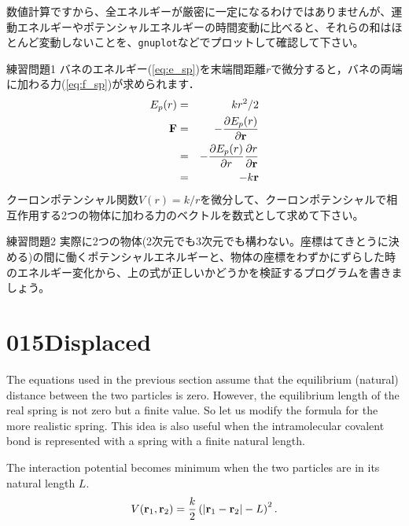 \documentclass[a4,10pt]{article}
\begin{document}
数値計算ですから、全エネルギーが厳密に一定になるわけではありませんが、運動エネルギーやポテンシャルエネルギーの時間変動に比べると、それらの和はほとんど変動しないことを、{\tt gnuplot}などでプロットして確認して下さい。

\begin{itembox}[l]{練習問題1}
バネのエネルギー(\ref{eq:e_sp})を末端間距離$r$で微分すると，バネの両端に加わる力(\ref{eq:f_sp})が求められます．
\begin{eqnarray}
E_p(r)&=&kr^2/2\\
{\bf F}&=&-\frac{\partial E_p(r)}{\partial {\bf r}}\\
&=&-\frac{\partial E_p(r)}{\partial r}\frac{\partial r}{\partial {\bf r}}\\
&=&-k{\bf r}
\end{eqnarray}
クーロンポテンシャル関数$V(r) = k / r$を微分して、クーロンポテンシャルで相互作用する2つの物体に加わる力のベクトルを数式として求めて下さい。
\end{itembox}

\begin{itembox}[l]{練習問題2}
実際に2つの物体(2次元でも3次元でも構わない。座標はてきとうに決める)の間に働くポテンシャルエネルギーと、物体の座標をわずかにずらした時のエネルギー変化から、上の式が正しいかどうかを検証するプログラムを書きましょう。
\end{itembox}



\section{015Displaced}

The equations used in the previous section assume that the equilibrium (natural) distance between the two particles is zero.  However, the equilibrium length of the real spring is not zero but a finite value.  So let us modify the formula for the more realistic spring.  This idea is also useful when the intramolecular covalent bond is represented with a spring with a finite natural length.

The interaction potential becomes minimum when the two particles are in its natural length $L$.
\begin{equation}
V({\bf r}_1, {\bf r}_2) = \frac{k}{2}\left(\left|{\bf r}_1-{\bf r}_2\right| - L\right)^2.
\end{equation}
\end{document}
